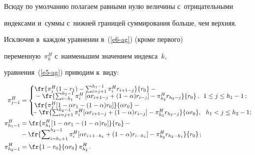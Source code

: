   


  Всюду по умолчанию полагаем равными нулю величины с~отрицательными 


индексами и~суммы с~нижней границей суммирования больше, чем верхняя. 


Исключив в~каждом уравнении в~(\ref{e6-ag}) (кроме первого) 


переменную~$\pi_k^H$ с~наименьшим значением индекса~$k$, 


уравнения~(\ref{e5-ag}) приводим к~виду:




\begin{align*}


  \hspace*{-5pt}\pi^H_{j-1} &= 


  \begin{cases}


  \fr{\pi^H_j(1-r_1)-\sum\nolimits_{i=j+1}^{h_1-1} 


 \pi_i^H r_{i+1-j}}{r_0}-{}\\[-3pt]


{} - \fr{\sum\nolimits_{i=h_1}^{h_2-1} \pi_i^H \left[ \alpha 


r_{i+1-j}+(1-\alpha) r_{i-j}\right] -\pi^H_{h_2} r_{h_2-j}} {r_0}\,,\enskip 


  1\leq j\leq h_1-1\,;\hspace*{-12pt}\\


  \fr{\pi_j^H [1-\alpha r_1-(1-\alpha)r_0]}{\alpha r_0} - {}\\[-3pt]


\!\!\!{}-\fr{\sum\nolimits_{i=j+1}^{h_2-1} \pi_i^H [ \alpha r_{i+1-j}+(1-\alpha)r_{i-j}] -


\pi^H_{h_2} r_{h_2-j}} {\alpha r_0},\ \ 


  h_1<j\leq h_2-1;\hspace*{-11pt}


  \end{cases}\\


    \hspace*{-5pt}\pi^H_{h_1-1} &= \fr{\pi^H_{h_1} [1-\alpha r_1 -(1-\alpha) r_0]}{r_0} -{}\\[-3pt]


   \hspace*{-5pt} &{}- 


\fr{\sum\nolimits_{i=h_1+1}^{h_2-1} \pi_i^H [ \alpha r_{i+1-h_1} +(1-\alpha) 


r_{i-h_1}] -\pi^H_{h_2} r_{h_2-h_1}}{r_0}\,;\\


  \pi^H_{h_2-1} &= \fr{1-r_0}{\alpha r_0}\,\pi^H_{h_2}\,.


\end{align*}


